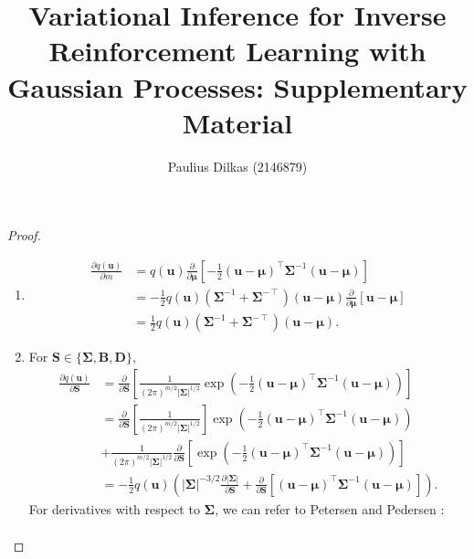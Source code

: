 \documentclass{article}
\title{Variational Inference for Inverse Reinforcement Learning with Gaussian
  Processes: Supplementary Material}
\author{Paulius Dilkas (2146879)}
\theoremstyle{definition}
\theoremstyle{remark}
\newcommand{\dm}{\frac{\partial}{\partial\bm\mu}}
\newcommand{\dS}{\frac{\partial}{\partial\mathbf{S}}}
\begin{document}
\maketitle

\begin{proof}
  \leavevmode
  \begin{enumerate}
  \item
    \[
      \begin{split}
        \frac{\partial q(\mathbf{u})}{\partial m} &=
        q(\mathbf{u})\dm\left[-\frac{1}{2}(\mathbf{u} -
          \bm\mu)^\intercal\bm\Sigma^{-1}(\mathbf{u} - \bm\mu)\right]
        \\
        &= -\frac{1}{2}q(\mathbf{u})(\bm\Sigma^{-1} +
        \bm\Sigma^{-\intercal})(\mathbf{u} - \bm\mu)\dm[\mathbf{u} -
        \bm\mu] \\
        &= \frac{1}{2}q(\mathbf{u})(\bm\Sigma^{-1} +
        \bm\Sigma^{-\intercal})(\mathbf{u} - \bm\mu).
      \end{split}
    \]
  \item For $\mathbf{S} \in \{ \bm\Sigma, \mathbf{B}, \mathbf{D} \}$,
    \begin{align}
      \frac{\partial q(\mathbf{u})}{\partial \mathbf{S}} &= \dS\left[\frac{1}{(2\pi)^{m/2}|\bm\Sigma|^{1/2}}\exp \left( -\frac{1}{2} (\mathbf{u} - \bm\mu)^\intercal\bm\Sigma^{-1}(\mathbf{u} - \bm\mu)\right)\right] \nonumber \\
                                                         &= \dS\left[\frac{1}{(2\pi)^{m/2}|\bm\Sigma|^{1/2}}\right]\exp \left( -\frac{1}{2} (\mathbf{u} - \bm\mu)^\intercal\bm\Sigma^{-1}(\mathbf{u} - \bm\mu)\right) \nonumber \\
                                                         &+ \frac{1}{(2\pi)^{m/2}|\bm\Sigma|^{1/2}}\dS\left[\exp\left( -\frac{1}{2} (\mathbf{u} - \bm\mu)^\intercal\bm\Sigma^{-1}(\mathbf{u} - \bm\mu)\right)\right] \nonumber \\
                                                         &= -\frac{1}{2} q(\mathbf{u}) \left( |\bm\Sigma|^{-3/2} \frac{\partial |\bm\Sigma|}{\partial \mathbf{S}} + \dS[(\mathbf{u} - \bm\mu)^\intercal\bm\Sigma^{-1}(\mathbf{u} - \bm\mu)] \right). \label{eq:2_before}
    \end{align}
    For derivatives with respect to $\bm\Sigma$, we can refer to Petersen and
    Pedersen \cite{petersen2008matrix}:
    \begin{equation} \label{eq:partial_derivatives1}
      \begin{gathered}

\end{gathered}
\end{equation}
\end{enumerate}
\end{proof}
\end{document}
